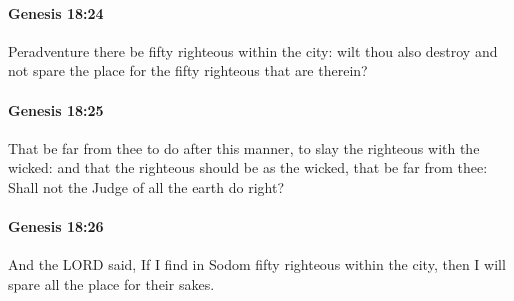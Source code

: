 		\paragraph{Genesis 18:24} %
			\label{GENESIS-18-24}

			Peradventure there be fifty righteous within the city: wilt thou also destroy and not spare the place for the fifty righteous that are therein?


		\paragraph{Genesis 18:25} %
			\label{GENESIS-18-25}

			That be far from thee to do after this manner, to slay the righteous with the wicked: and that the righteous should be as the wicked, that be far from thee: Shall not the Judge of all the earth do right?


		\paragraph{Genesis 18:26} %
			\label{GENESIS-18-26}

			And the LORD said, If I find in Sodom fifty righteous within the city, then I will spare all the place for their sakes.


